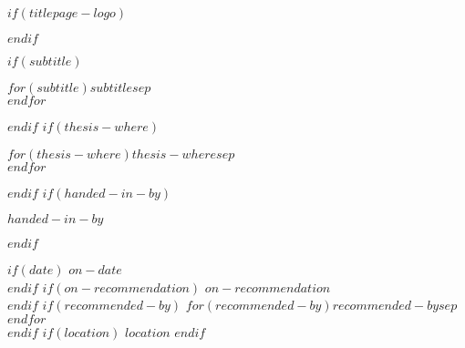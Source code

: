 \begin{titlepage}
\makeatletter
$if(titlepage-logo)$
\begin{center}

\end{center}
$endif$
\vspace{1cm}
\begin{center}
\Huge\textbf{\@title}
\end{center}
$if(subtitle)$
\begin{center}
\fontsize{16pt}{18pt}\selectfont
$for(subtitle)$$subtitle$$sep$\\ $endfor$\\
\end{center}
$endif$
\vspace{1cm}
$if(thesis-where)$
\begin{center}
$for(thesis-where)$$thesis-where$$sep$\\ $endfor$
\end{center}
$endif$
$if(handed-in-by)$
\begin{center}
$handed-in-by$
\end{center}
$endif$
\@author
\begin{center}
$if(date)$
$on-date$ \@date\\
$endif$
$if(on-recommendation)$
$on-recommendation$\\
$endif$
$if(recommended-by)$
\vspace{0.5cm}
$for(recommended-by)$$recommended-by$$sep$\\ $endfor$\\
$endif$
$if(location)$
\vfill
$location$
\vspace{1cm}
$endif$
\end{center}
\makeatother
\end{titlepage}
